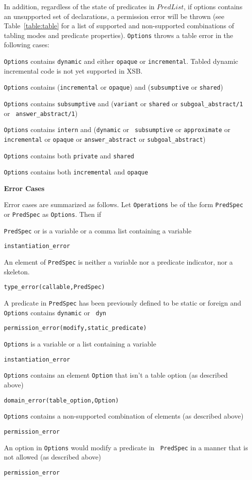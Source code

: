 \begin{description}
In addition, regardless of the state of predicates in $PredList$, if
options contains an unsupported set of declarations, a permission error
will be thrown (see Table~\ref{table:table} for a list of supported
and non-supported combinations of tabling modes and predicate
properties).  {\tt Options} throws a table error in the following
cases:
%
\bi
\item {\tt Options} contains {\tt dynamic} and either {\tt opaque} or
  {\tt incremental}.  Tabled dynamic incremental code is not yet
  supported in XSB.

\item {\tt Options} contains ({\tt incremental} or {\tt opaque}) and
  ({\tt subsumptive} or {\tt shared})

\item {\tt Options} contains {\tt subsumptive} and ({\tt variant} or
  {\tt shared} or {\tt subgoal\_abstract/1} or {\tt
    answer\_abstract/1})

\item {\tt Options} contains {\tt intern} and ({\tt dynamic} or {\tt
subsumptive} or {\tt approximate} or {\tt incremental} or {\tt opaque}
or {\tt answer\_abstract} or {\tt subgoal\_abstract})
%
\item {\tt Options} contains both {\tt private} and {\tt shared}
%
\item {\tt Options} contains both {\tt incremental} and {\tt opaque}
\ei

{\bf Error Cases}

Error cases are summarized as follows.  Let {\tt Operations} be of the
form {\tt PredSpec} or {\tt PredSpec} as {\tt Options}.  Then if 
%
\bi
\item {\tt PredSpec} or is a variable or a comma list containing a variable
\bi
\item {\tt instantiation\_error}
\ei
\item An element of {\tt PredSpec} is neither a variable nor a
  predicate indicator, nor a skeleton.
\bi
\item 	{\tt type\_error(callable,PredSpec)}
\ei
\item A predicate in {\tt PredSpec} has been previously defined to be
  static or foreign and {\tt Options} contains {\tt dynamic} or {\tt
    dyn}
\bi
\item 	{\tt permission\_error(modify,static\_predicate)}
\ei
\item {\tt Options} is a variable or a list containing a variable
\bi
\item {\tt instantiation\_error}
\ei
\item {\tt Options} contains an element {\tt Option} that isn't a table option (as described above)
\bi
\item {\tt domain\_error(table\_option,Option)}
\ei
\item {\tt Options} contains a non-supported combination of  elements (as described above)
\bi
\item {\tt permission\_error}
\ei
\item An option in {\tt Options} would modify a predicate in {\tt
  PredSpec} in a manner that is not allowed (as described above) 
\bi
\item {\tt permission\_error}
\ei
\ei


\end{description}
